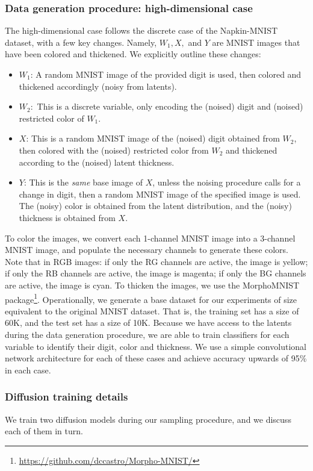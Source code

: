 \documentclass{article}
\theoremstyle{plain}
\theoremstyle{definition}
\theoremstyle{remark}
\begin{document}
	\subsubsection{Data generation procedure: high-dimensional case}
	The high-dimensional case follows the discrete case of the Napkin-MNIST dataset, with a few key changes. Namely, $W_1, X,$ and $Y$ are MNIST images that have been colored and thickened. We explicitly outline these changes:
	\begin{itemize}
		\item $W_1$: A random MNIST image of the provided digit is used, then colored and thickened accordingly (noisy from latents).
		\item $W_2:$ This is a discrete variable, only encoding the (noised) digit and (noised) restricted color of $W_1$.
		\item $X$: This is a random MNIST image of the (noised) digit obtained from $W_2$, then colored with the (noised) restricted color from $W_2$ and thickened according to the (noised) latent thickness.
		\item $Y$: This is the \emph{same} base image of $X$, unless the noising procedure calls for a change in digit, then a random MNIST image of the specified image is used. The (noisy) color is obtained from the latent distribution, and the (noisy) thickness is obtained from $X$.
	\end{itemize}
	To color the images, we convert each 1-channel MNIST image into a 3-channel MNIST image, and populate the necessary channels to generate these colors. Note that in RGB images: if only the RG channels are active, the image is yellow; if only the RB channels are active, the image is magenta; if only the BG channels are active, the image is cyan. To thicken the images, we use the MorphoMNIST~\citet{castro2019morpho} package\footnote{\href{https://github.com/dccastro/Morpho-MNIST/}{https://github.com/dccastro/Morpho-MNIST/}}.
	Operationally, we generate a base dataset for our experiments of size equivalent to the original MNIST dataset. That is, the training set has a size of 60K, and the test set has a size of 10K. Because we have access to the latents during the data generation procedure, we are able to train classifiers for each variable to identify their digit, color and thickness. We use a simple convolutional network architecture for each of these cases and achieve accuracy upwards of 95\% in each case.
	
	
	
	
	\subsubsection{Diffusion training details}
	We train two diffusion models during our sampling procedure, and we discuss each of them in turn.
	
\end{document}
